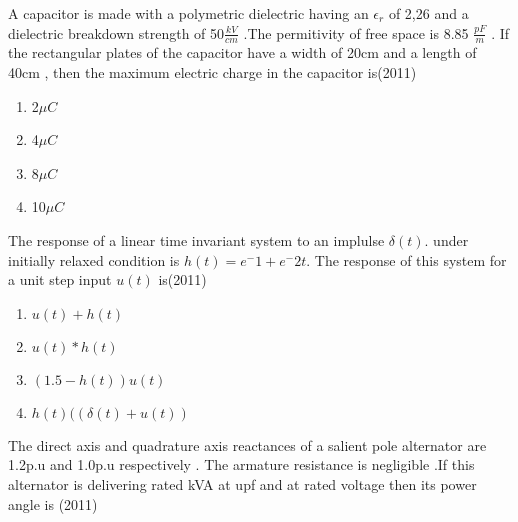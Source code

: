 \iffalse
\chapter{2011}
\author{Prajwal naik}
\section{ee}
\fi







    \item A capacitor is made with a polymetric dielectric having an $\epsilon_r$ of 2,26 and a dielectric breakdown strength of 50$\frac{kV}{cm}$ .The permitivity of free space is 8.85 $\frac{pF}{m}$ . If the rectangular plates of the capacitor have a width of 20cm and a length of 40cm , then the maximum electric charge in the capacitor is\hfill{(2011)}
    \begin{multicols}{4}
			\begin{enumerate}
\item 2$\mu C$
\item 4$\mu C$
\item 8$\mu C$
\item 10$\mu C$
        \end{enumerate}
		\end{multicols}


	\item The response of a linear time invariant system to an implulse $\delta (t)$. under initially relaxed condition is $h(t)=e^-1 +e^-2t$. The response of this system for a unit step input $u(t)$ is\hfill{(2011)}


		\begin{multicols}{4}
			\begin{enumerate}
	\item  $u(t) +h(t)$
\item $u(t)*h(t)$
\item$(1.5-h(t))u(t)$
\item $h(t)((\delta  (t) + u(t))$
			\end{enumerate}
		\end{multicols}


	\item The direct axis and quadrature axis reactances of a salient pole alternator are 1.2p.u and 1.0p.u respectively . The armature resistance is negligible .If this alternator is delivering rated kVA at upf and at rated voltage then its power angle is \hfill{(2011)}
        
